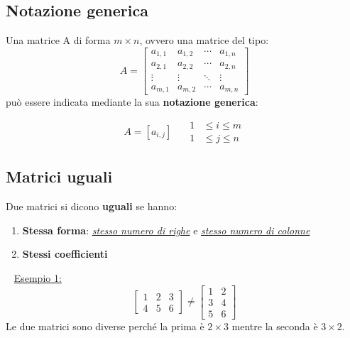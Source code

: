 \documentclass[12pt,oneside]{book}
\begin{document}
\subsection{Notazione generica}
Una matrice A di forma $m \times n$, ovvero una matrice del tipo:
\begin{equation*}
    A =
    \begin{bmatrix}
        a_{1,1} & a_{1,2} & \cdots & a_{1,n} \\
        a_{2,1} & a_{2,2} & \cdots & a_{2,n} \\
        \vdots  & \vdots  & \ddots & \vdots  \\
        a_{m,1} & a_{m,2} & \cdots & a_{m,n}
    \end{bmatrix}
\end{equation*}
può essere indicata mediante la sua \textbf{notazione generica}:

\begin{equation*}
    A = [a_{i,j}] \;\;\;\;\; \begin{aligned} 1&\le i\le m\\ 1&\le j\le n \end{aligned}
\end{equation*}

\subsection{Matrici uguali}
Due matrici si dicono \textbf{uguali} se hanno:
\begin{enumerate}
    \item \textbf{Stessa forma}: \emph{\underline{stesso numero di righe}} e \emph{\underline{stesso numero di colonne}}
    \item \textbf{Stessi coefficienti}
\end{enumerate}
~\newline
\underline{Esempio 1:}
\begin{equation*}
    \begin{bmatrix}
        1 & 2 & 3 \\
        4 & 5 & 6
    \end{bmatrix}
    \neq
    \begin{bmatrix}
        1 & 2 \\
        3 & 4 \\
        5 & 6
    \end{bmatrix}
\end{equation*}
Le due matrici sono diverse perché la prima è $2\times 3$ mentre la seconda è $3\times 2$.
\end{document}
